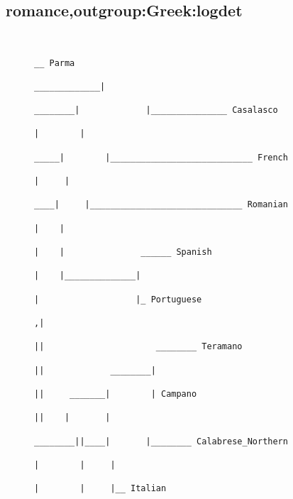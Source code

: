 \subsection{romance,outgroup:Greek:logdet}
\begin{figure}[H]
\begin{center}
{
\selectfont
\begin{verbatim}

                                                                                                                          __ Parma
                                                                                                            _____________|
                                                                                                   ________|             |_______________ Casalasco
                                                                                                  |        |
                                                                                             _____|        |____________________________ French
                                                                                            |     |
                                                                                        ____|     |______________________________ Romanian
                                                                                       |    |
                                                                                       |    |               ______ Spanish
                                                                                       |    |______________|
                                                                                       |                   |_ Portuguese
                                                                                      ,|
                                                                                      ||                      ________ Teramano
                                                                                      ||             ________|
                                                                                      ||     _______|        | Campano
                                                                                      ||    |       |
                                                                              ________||____|       |________ Calabrese_Northern
                                                                             |        |     |
                                                                             |        |     |__ Italian

\end{verbatim}}
\end{center}
\end{figure}
